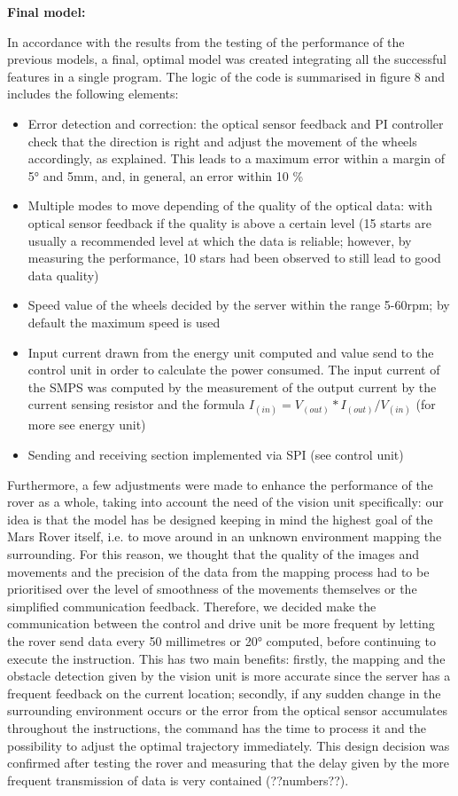 \documentclass[10pt,twoside]{article}
\begin{document}
\textbf{Final model:}

In accordance with the results from the testing of the performance of the previous models, a final, optimal model was created integrating all the successful features in a single program.
The logic of the code is summarised in figure 8 and includes the following elements:
\begin{itemize}
\item 	Error detection and correction: the optical sensor feedback and PI controller check that the direction is right and adjust the movement of the wheels accordingly, as explained. This leads to a maximum error within a margin of 5° and 5mm, and, in general, an error within 10 \%
\item 	Multiple modes to move depending of the quality of the optical data: with optical sensor feedback if the quality is above a certain level (15 starts are usually a recommended level at which the data is reliable; however, by measuring the performance, 10 stars had been observed to still lead to good data quality)
\item 	Speed value of the wheels decided by the server within the range 5-60rpm; by default the maximum speed is used
\item 	Input current drawn from the energy unit computed and value send to the control unit in order to calculate the power consumed. The input current of the SMPS was computed by the measurement of the output current by the current sensing resistor and the formula $I_(in) = V_(out)*I_(out)/V_(in)$ (for more see energy unit)

\item 	Sending and receiving section implemented via SPI (see control unit)
\end{itemize}

Furthermore, a few adjustments were made to enhance the performance of the rover as a whole, taking into account the need of the vision unit specifically: our idea is that the model has be designed keeping in mind the highest goal of the Mars Rover itself, i.e. to move around in an unknown environment mapping the surrounding. For this reason, we thought that the quality of the images and movements and the precision of the data from the mapping process had to be prioritised over the level of smoothness of the movements themselves or the simplified communication feedback. Therefore, we decided make the communication between the control and drive unit be more frequent by letting the rover send data every 50 millimetres or 20° computed, before continuing to execute the instruction. This has two main benefits: firstly, the mapping and the obstacle detection given by the vision unit is more accurate since the server has a frequent feedback on the current location; secondly, if any sudden change in the surrounding environment occurs or the error from the optical sensor accumulates throughout the instructions, the command has the time to process it and the possibility to adjust the optimal trajectory immediately. This design decision was confirmed after testing the rover and measuring that the delay given by the more frequent transmission of data is very contained (??numbers??).
\end{document}
